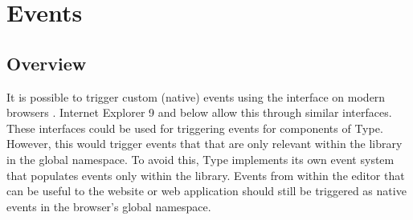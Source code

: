 









\section{Events}
\label{sec:events}
\subsection{Overview}

It is possible to trigger custom (native) events using the  interface on modern browsers \cite{mozev}. Internet Explorer 9 and below allow this through similar interfaces. These interfaces could be used for triggering events for components of Type. However, this would trigger events that that are only relevant within the library in the global namespace. To avoid this, Type implements its own event system that populates events only within the library. Events from within the editor that can be useful to the website or web application should still be triggered as native events in the browser's global namespace. %

